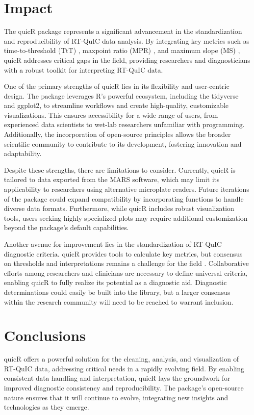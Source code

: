 \documentclass[preprint,12pt,a4paper]{elsarticle}
\begin{document}
            

    \section{Impact}

        The quicR package represents a significant advancement in the standardization and reproducibility of RT-QuIC data analysis. By integrating key metrics such as time-to-threshold (TtT) \cite{Orru2015}, maxpoint ratio (MPR) \cite{Rowden2023}, and maximum slope (MS) \cite{Henderson2015}, quicR addresses critical gaps in the field, providing researchers and diagnosticians with a robust toolkit for interpreting RT-QuIC data.

        One of the primary strengths of quicR lies in its flexibility and user-centric design. The package leverages R’s powerful ecosystem, including the tidyverse and ggplot2, to streamline workflows and create high-quality, customizable visualizations. This ensures accessibility for a wide range of users, from experienced data scientists to wet-lab researchers unfamiliar with programming. Additionally, the incorporation of open-source principles allows the broader scientific community to contribute to its development, fostering innovation and adaptability.

        Despite these strengths, there are limitations to consider. Currently, quicR is tailored to data exported from the MARS software, which may limit its applicability to researchers using alternative microplate readers. Future iterations of the package could expand compatibility by incorporating functions to handle diverse data formats. Furthermore, while quicR includes robust visualization tools, users seeking highly specialized plots may require additional customization beyond the package’s default capabilities.

        Another avenue for improvement lies in the standardization of RT-QuIC diagnostic criteria. quicR provides tools to calculate key metrics, but consensus on thresholds and interpretations remains a challenge for the field \cite{Rowden2023}. Collaborative efforts among researchers and clinicians are necessary to define universal criteria, enabling quicR to fully realize its potential as a diagnostic aid. Diagnostic determinations could easily be built into the library, but a larger consensus within the research community will need to be reached to warrant inclusion.

    \section{Conclusions}
        quicR offers a powerful solution for the cleaning, analysis, and visualization of RT-QuIC data, addressing critical needs in a rapidly evolving field. By enabling consistent data handling and interpretation, quicR lays the groundwork for improved diagnostic consistency and reproducibility. The package's open-source nature ensures that it will continue to evolve, integrating new insights and technologies as they emerge.
\end{document}
